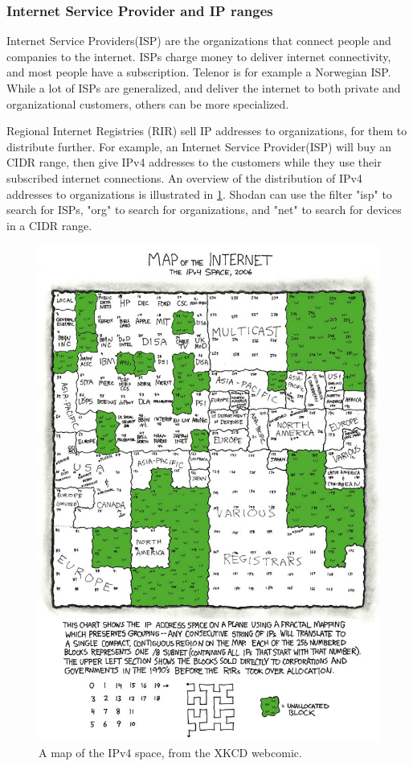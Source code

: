 \subsubsection{Internet Service Provider and IP ranges} \label{sec:isp_method}
Internet Service Providers(ISP) are the organizations that connect people and companies to the internet. ISPs charge money to deliver internet connectivity, and most people have a subscription. Telenor is for example a Norwegian ISP. While a lot of ISPs are generalized, and deliver the internet to both private and organizational customers, others can be more specialized. 

Regional Internet Registries (RIR) sell IP addresses to organizations, for them to distribute further. For example, an Internet Service Provider(ISP) will buy an CIDR range, then give IPv4 addresses to the customers while they use their subscribed internet connections. An overview of the distribution of IPv4 addresses to organizations is illustrated in \cref{fig:ipv4_map}. Shodan can use the filter "isp" to search for ISPs, "org" to search for organizations, and "net" to search for devices in a CIDR range. 

\begin{figure} [H]
    \centering
    \includegraphics[scale=4]{Figurer/map_of_the_internet.jpg}
    \caption{A map of the IPv4 space, from the XKCD webcomic. \cite{xkcd} }
    \label{fig:ipv4_map}
\end{figure}


